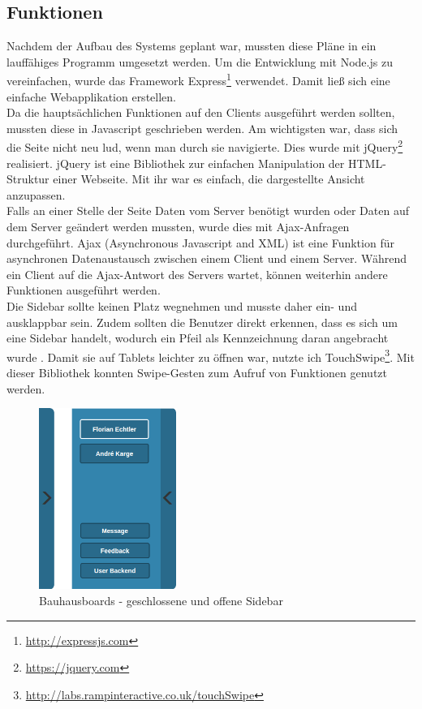 \subsection{Funktionen}\label{Funktionen}
Nachdem der Aufbau des Systems geplant war, mussten diese Pläne in ein lauffähiges Programm umgesetzt werden.
Um die Entwicklung mit Node.js zu vereinfachen, wurde das Framework Express\footnote{\url{http://expressjs.com}} verwendet. Damit ließ sich eine einfache Webapplikation erstellen.
\\
Da die hauptsächlichen Funktionen auf den Clients ausgeführt werden sollten, mussten diese in Javascript geschrieben werden.
Am wichtigsten war, dass sich die Seite nicht neu lud, wenn man durch sie navigierte. Dies wurde mit jQuery\footnote{\url{https://jquery.com}} realisiert. jQuery ist eine Bibliothek zur einfachen Manipulation der HTML-Struktur einer Webseite. Mit ihr war es einfach, die dargestellte Ansicht anzupassen.
\\
Falls an einer Stelle der Seite Daten vom Server benötigt wurden oder Daten auf dem Server geändert werden mussten, wurde dies mit Ajax-Anfragen durchgeführt. Ajax (Asynchronous Javascript and XML) ist eine Funktion für asynchronen Datenaustausch zwischen einem Client und einem Server.
Während ein Client auf die Ajax-Antwort des Servers wartet, können weiterhin andere Funktionen ausgeführt werden.
\\
Die Sidebar sollte keinen Platz wegnehmen und musste daher ein- und ausklappbar sein. Zudem sollten die Benutzer direkt erkennen, dass es sich um eine Sidebar handelt, wodurch ein Pfeil als Kennzeichnung daran angebracht wurde .
Damit sie auf Tablets leichter zu öffnen war, nutzte ich TouchSwipe\footnote{\url{http://labs.rampinteractive.co.uk/touchSwipe}}. Mit dieser Bibliothek konnten Swipe-Gesten zum Aufruf von Funktionen genutzt werden.
\begin{figure}[h!]
  \centering
    \includegraphics[width=0.4\textwidth]{./img/Sidebar.png}
  \caption{Bauhausboards - geschlossene und offene Sidebar}
  \label{img:sidebar}
\end{figure}
